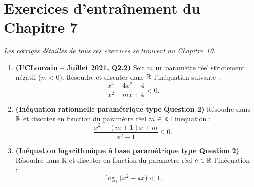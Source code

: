 \section{Exercices d'entraînement du Chapitre 7}

\emph{Les corrigés détaillés de tous ces exercices se trouvent au Chapitre~10.}

\begin{enumerate}[label=\textbf{Exercice 7.\arabic* :}, leftmargin=*]
    \item \textbf{(UCLouvain -- Juillet 2021, Q2.2)} Soit $m$ un paramètre réel strictement négatif ($m < 0$). Résoudre et discuter dans $\mathbb{R}$ l'inéquation suivante :
    \[
        \frac{x^4 - 4x^2 + 4}{x^2 - mx + 4} < 0.
    \]
    \item \textbf{(Inéquation rationnelle paramétrique type Question 2)} Résoudre dans $\mathbb{R}$ et discuter en fonction du paramètre réel $m \in \mathbb{R}$ l'inéquation :
    \[
        \frac{x^2 - (m + 1)x + m}{x^2 - 1} \le 0.
    \]
    \item \textbf{(Inéquation logarithmique à base paramétrique type Question 2)} Résoudre dans $\mathbb{R}$ et discuter en fonction du paramètre réel $a \in \mathbb{R}$ l'inéquation :
    \[
        \log_a\bigl(x^2 - ax\bigr) < 1.
    \]
\end{enumerate}
